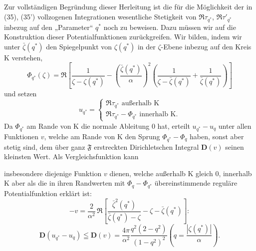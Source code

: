 \documentclass{article}
\begin{document}
Zur vollständigen Begründung dieser Herleitung ist die für die Möglichkeit der in (35), (35') vollzogenen Integrationen wesentliche Stetigkeit von $\Re\tau_{q^*}$, $\Re\tau'_{q^*}$ inbezug auf den „Parameter“ $q^*$ noch zu beweisen. Dazu müssen wir auf die Konstruktion dieser Potentialfunktionen zurückgreifen. Wir bilden, indem wir unter $\bar{\zeta}(q^*)$ den Spiegelpunkt von $\zeta(q^*)$ in der $\zeta$-Ebene inbezug auf den Kreis $\mathrm{K}$ verstehen,
\[ \Phi_{q^*}(\zeta) = \Re \left[ \frac{1}{\zeta - \zeta(q^*)} - \left( \frac{\bar{\zeta}(q^*)}{\alpha} \right)^2 \left( \frac{1}{\zeta - \bar{\zeta}(q^*)} + \frac{1}{\bar{\zeta}(q^*)} \right) \right] \]
und setzen
\[ u_{q^*} = \begin{cases}
\Re\tau_{q^*} \text{ außerhalb } \mathrm{K} \\
\Re\tau_{q^*} - \Phi_{q^*} \text{ innerhalb } \mathrm{K}.
\end{cases} \]
Da $\Phi_{q^*}$ am Rande von $\mathrm{K}$ die normale Ableitung $0$ hat, erteilt $u_{q^*} - u_q$ unter allen Funktionen $v$, welche am Rande von $\mathrm{K}$ den Sprung $\Phi_{q^*} - \Phi_q$ haben, sonst aber stetig sind, dem über ganz $\mathfrak{F}$ erstreckten Dirichletschen Integral $\mathbf{D}(v)$ seinen kleinsten Wert. Als Vergleichsfunktion kann

insbesondere diejenige Funktion $v$ dienen, welche außerhalb $\mathrm{K}$ gleich $0$, innerhalb $\mathrm{K}$ aber als die in ihren Randwerten mit $\Phi_q - \Phi_{q^*}$ übereinstimmende reguläre Potentialfunktion erklärt ist:
\[ -v = \frac{2}{\alpha^2} \, \Re \left[ \frac{\bar{\zeta}^2(q^*)}{\bar{\zeta}(q^*) - \zeta} - \zeta - \bar{\zeta}(q^*) \right]\colon \]
\[ \mathbf{D}(u_{q^*} - u_q) \leqq \mathbf{D}(v) = \frac{4\pi}{\alpha^2} \frac{q^2(2 - q^2)}{(1 - q^2)^2} \left( q = \frac{|\zeta(q^*)|}{\alpha} \right). \tag{36} \]
\end{document}
